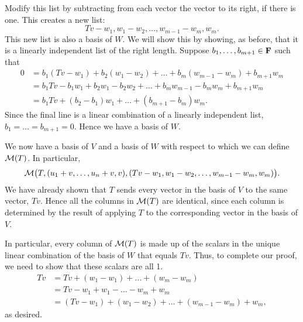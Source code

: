\documentclass[a5paper]{article}
\begin{document}
    Modify this list by subtracting from each vector the vector to its right, if there is one.
    This creates a new list:
\begin{equation*}
        Tv-w_1, w_1-w_2, \dots, w_{m-1}-w_m, w_m .
\end{equation*}
    This new list is also a basis of $W$.
    We will show this by showing, as before, that it is a linearly independent list of the right length.
    Suppose $b_1,\dots,b_{m+1} \in \mathbf{F}$ such that
\begin{align*}
        0 &= b_1(Tv-w_1) + b_2(w_1-w_2) + \dots + b_m(w_{m-1}-w_m) + b_{m+1}w_m \\
          &= b_1Tv - b_1w_1 + b_2w_1 - b_2w_2 + \dots + b_mw_{m-1} - b_mw_m + b_{m+1}w_m \\
          &= b_1Tv + (b_2 - b_1)w_1 + \dots + (b_{m+1} - b_m)w_m .
\end{align*}
    Since the final line is a linear combination of a linearly independent list, $b_1=\dots=b_{m+1}=0$.
    Hence we have a basis of $W$.

    We now have a basis of $V$ and a basis of $W$ with respect to which we can define $\mathcal{M}(T)$.
    In particular,
\begin{equation*}
        \mathcal{M} \big(T,  (u_1+v, \dots, u_n+v, v),  (Tv-w_1, w_1-w_2, \dots, w_{m-1}-w_m, w_m) \big) .
\end{equation*}
    We have already shown that $T$ sends every vector in the basis of $V$ to the same vector, $Tv$.
    Hence all the columns in $\mathcal{M}(T)$ are identical, since each column is determined by the result of applying $T$ to the corresponding vector in the basis of $V$.

    In particular, every column of $\mathcal{M}(T)$ is made up of the scalars in the unique linear combination of the basis of $W$ that equals $Tv$.
    Thus, to complete our proof, we need to show that these scalars are all 1.
\begin{align*}
        Tv &= Tv + (w_1 - w_1) + \dots + (w_m - w_m) \\
           &= Tv - w_1 + w_1 - \dots - w_m + w_m \\
           &= (Tv - w_1) + (w_1 - w_2) + \dots + (w_{m-1} - w_m) + w_m ,
\end{align*}
    as desired.
\end{document}
